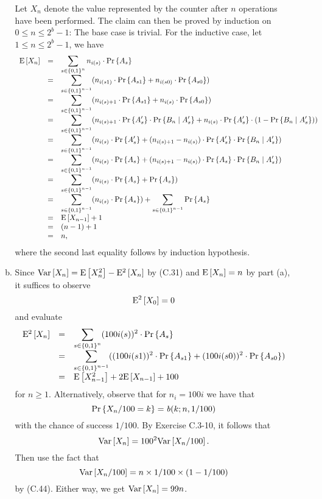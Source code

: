 \begin{enumerate}[\thechapter-1]
\begin{enumerate}[(a)]
Let $X_n$ denote the value represented by the counter after $n$  operations have been performed. The claim can then be proved by induction on $0 \leq n \leq 2^b - 1$: The base case is trivial. For the inductive case, let $1 \leq n \leq 2^b - 1$, we have
\[
\begin{array}{lll}
\mathrm{E}\left[X_n\right] & = & {\displaystyle\sum_{s \in \left\{0, 1\right\}^{n}} n_{i(s)} \cdot \Pr\left\{A_s\right\}} \cr
         & = & {\displaystyle\sum_{s \in \left\{0, 1\right\}^{n - 1}} (n_{i(s1)} \cdot \Pr\left\{A_{s1}\right\} + n_{i(s0)} \cdot \Pr\left\{A_{s0}\right\})} \cr
         & = & {\displaystyle\sum_{s \in \left\{0, 1\right\}^{n - 1}} (n_{i(s) + 1} \cdot \Pr\left\{A_{s1}\right\} + n_{i(s)} \cdot \Pr\left\{A_{s0}\right\})} \cr
         & = & {\displaystyle\sum_{s \in \left\{0, 1\right\}^{n - 1}} (n_{i(s) + 1} \cdot \Pr\left\{A'_s\right\} \cdot \Pr\left\{B_n \mid A'_s\right\} + n_{i(s)} \cdot \Pr\left\{A'_s\right\} \cdot (1 - \Pr\left\{B_n \mid A'_s\right\}))} \cr
         & = & {\displaystyle\sum_{s \in \left\{0, 1\right\}^{n - 1}} (n_{i(s)} \cdot \Pr\left\{A'_s\right\} + (n_{i(s) + 1} - n_{i(s)}) \cdot \Pr\left\{A'_s\right\} \cdot \Pr\left\{B_n \mid A'_s\right\})} \cr
         & = & {\displaystyle\sum_{s \in \left\{0, 1\right\}^{n - 1}} (n_{i(s)} \cdot \Pr\left\{A_s\right\} + (n_{i(s) + 1} - n_{i(s)}) \cdot \Pr\left\{A_s\right\} \cdot \Pr\left\{B_n \mid A'_s\right\})} \cr
         & = & {\displaystyle\sum_{s \in \left\{0, 1\right\}^{n - 1}} (n_{i(s)} \cdot \Pr\left\{A_s\right\} + \Pr\left\{A_s\right\})} \cr
         & = & {\displaystyle\sum_{s \in \left\{0, 1\right\}^{n - 1}} (n_{i(s)} \cdot \Pr\left\{A_s\right\}) + \sum_{s \in \left\{0, 1\right\}^{n - 1}} \Pr\left\{A_s\right\}} \cr
         & = & \mathrm{E}\left[X_{n - 1}\right] + 1 \cr
         & = & (n - 1) + 1 \cr
         & = & n, \cr
\end{array}
\]
where the second last equality follows by induction hypothesis.
\item Since $\mathrm{Var}\left[X_n\right] = \mathrm{E}\left[X_n^2\right] - \mathrm{E}^2\left[X_n\right]$ by (C.31) and $\mathrm{E}\left[X_n\right] = n$ by part (a), it suffices to observe
\[
\mathrm{E}^2\left[X_0\right] = 0
\]
and evaluate
\[
\begin{array}{lll}
\mathrm{E}^2\left[X_n\right] & = & {\displaystyle\sum_{s \in \left\{0, 1\right\}^{n}} (100i(s))^2 \cdot \Pr\left\{A_s\right\}} \cr
            & = & {\displaystyle\sum_{s \in \left\{0, 1\right\}^{n - 1}} ((100i(s1))^2 \cdot \Pr\left\{A_{s1}\right\} + (100i(s0))^2 \cdot \Pr\left\{A_{s0}\right\})} \cr
            & = & \mathrm{E}\left[X_{n - 1}^2\right] + 2 \mathrm{E}\left[X_{n - 1}\right] + 100 \cr
\end{array}
\]
for $n \geq 1$. Alternatively, observe that for $n_i = 100i$ we have that
\[
\Pr\left\{X_n / 100 = k\right\} = \mathit{b}(k; n, 1/100)
\]
with the chance of success $1/100$. By Exercise C.3-10, it follows that
\[
\mathrm{Var}\left[X_n\right] = 100^2 \mathrm{Var}\left[X_n / 100\right].
\]
Then use the fact that
\[
\mathrm{Var}\left[X_n / 100\right] = n \times 1/100 \times (1 - 1/100)
\]
by (C.44). Either way, we get $\mathrm{Var}\left[X_n\right] = 99n$.

\end{enumerate}
\end{enumerate}
